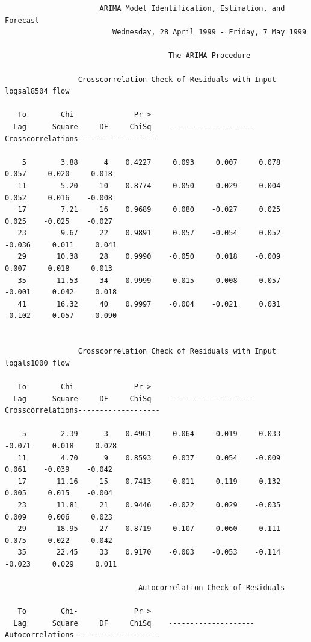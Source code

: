 \documentclass[12pt]{report}
\begin{document}
\begin{table} \scriptsize
\begin{centering}
\begin{verbatim}
                      ARIMA Model Identification, Estimation, and Forecast
                         Wednesday, 28 April 1999 - Friday, 7 May 1999

                                      The ARIMA Procedure

                 Crosscorrelation Check of Residuals with Input logsal8504_flow

   To        Chi-             Pr >
  Lag      Square     DF     ChiSq    --------------------Crosscorrelations-------------------

    5        3.88      4    0.4227     0.093     0.007     0.078     0.057    -0.020     0.018
   11        5.20     10    0.8774     0.050     0.029    -0.004     0.052     0.016    -0.008
   17        7.21     16    0.9689     0.080    -0.027     0.025     0.025    -0.025    -0.027
   23        9.67     22    0.9891     0.057    -0.054     0.052    -0.036     0.011     0.041
   29       10.38     28    0.9990    -0.050     0.018    -0.009     0.007     0.018     0.013
   35       11.53     34    0.9999     0.015     0.008     0.057    -0.001     0.042     0.018
   41       16.32     40    0.9997    -0.004    -0.021     0.031    -0.102     0.057    -0.090


                 Crosscorrelation Check of Residuals with Input logals1000_flow

   To        Chi-             Pr >
  Lag      Square     DF     ChiSq    --------------------Crosscorrelations-------------------

    5        2.39      3    0.4961     0.064    -0.019    -0.033    -0.071     0.018     0.028
   11        4.70      9    0.8593     0.037     0.054    -0.009     0.061    -0.039    -0.042
   17       11.16     15    0.7413    -0.011     0.119    -0.132     0.005     0.015    -0.004
   23       11.81     21    0.9446    -0.022     0.029    -0.035     0.009     0.006     0.023
   29       18.95     27    0.8719     0.107    -0.060     0.111     0.075     0.022    -0.042
   35       22.45     33    0.9170    -0.003    -0.053    -0.114    -0.023     0.029     0.011

                               Autocorrelation Check of Residuals

   To        Chi-             Pr >
  Lag      Square     DF     ChiSq    --------------------Autocorrelations--------------------


\end{verbatim}
\end{centering}
\end{table}
\end{document}
